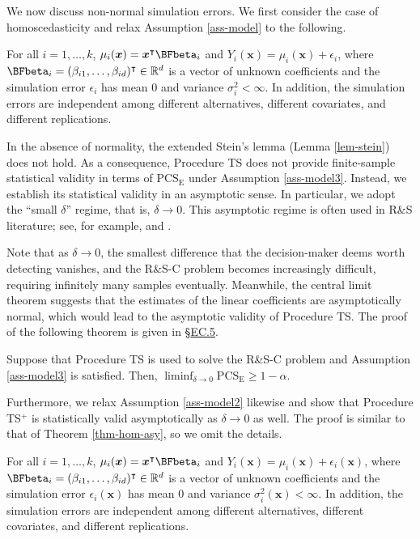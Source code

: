 \documentclass[ijoc,nonblindrev]{informs3}
\def\bx{{\bm x}}
\def\PCSE{\mathrm{PCS}_{\mathrm{E}}}
\begin{document}
We now discuss non-normal simulation errors.
We first consider the case of homoscedasticity and relax Assumption \ref{ass-model} to the following.

\begin{assumption}\label{ass-model3}
For all $i=1,\ldots,k$,
$\mu_i(\bx) = \bx^\intercal \BFbeta_i$ and
$Y_i(\bx) = \mu_i(\bx) + \epsilon_i$,
where $\BFbeta_i =( \beta_{i1}, \ldots, \beta_{id})^\intercal \in \mathbb{R}^{d}$ is a vector of unknown coefficients and the simulation error $\epsilon_i$ has mean $0$ and variance $\sigma_i^2<\infty$.
In addition, the simulation errors are independent among different alternatives, different covariates, and different replications.
\end{assumption}


In the absence of normality, the extended Stein's lemma (Lemma \ref{lem-stein}) does not hold.
As a consequence, Procedure TS does not provide finite-sample statistical validity in terms of $\PCSE$ under Assumption \ref{ass-model3}.
Instead, we establish its statistical validity in an asymptotic sense. In particular, we adopt the ``small $\delta$'' regime, that is, $\delta\to 0$.
This asymptotic regime is often used in R\&S literature; see, for example, \cite{kim2006} and \cite{luo2015}.


Note that as $\delta\to0$,  the smallest difference that the decision-maker deems worth detecting vanishes, and the R\&S-C problem becomes increasingly difficult, requiring infinitely many samples eventually.
Meanwhile, the central limit theorem suggests that the estimates of the linear coefficients are asymptotically normal, which would lead to the asymptotic validity of Procedure TS. The proof of the following theorem is given in \S\hyperlink{EC.5}{EC.5}.

\begin{theorem} \label{thm-hom-asy}
Suppose that Procedure TS is used to solve the R\&S-C problem and Assumption \ref{ass-model3} is satisfied. Then,
$\liminf_{\delta \to  0} \PCSE \geq 1-\alpha$.
\end{theorem}

Furthermore, we relax Assumption \ref{ass-model2} likewise and show that Procedure TS$^+$ is statistically valid asymptotically as $\delta \to 0$ as well. The proof is similar to that of Theorem \ref{thm-hom-asy}, so we omit the details.

\begin{assumption} \label{ass-model4}
For all $i=1,\ldots,k$,  $\mu_i(\bx) = \bx^\intercal \BFbeta_i$ and
$Y_i(\bx) = \mu_i(\bx) + \epsilon_i(\bx)$,
where $\BFbeta_i =( \beta_{i1}, \ldots, \beta_{id})^\intercal \in \mathbb{R}^{d}$ is a vector of unknown coefficients and the simulation error $\epsilon_i(\bx)$ has mean $0$ and variance $\sigma_i^2(\bx)<\infty$.
In addition, the simulation errors are independent among different alternatives, different covariates, and different replications.
\end{assumption}
\end{document}
